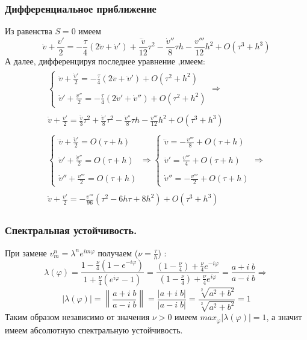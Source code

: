 \documentclass[a4paper,12pt]{article}
\begin{document}
\subsubsection{Дифференциальное приближение}
Из равенства $S=0$ имеем
\[
    \dot v + \frac{v'}{2}=-\frac{\tau}{4}(2\ddot v+ \dot v')+\frac{\dddot v}{12}\tau^2 -\frac{\dot v''}{8} \tau h -\frac{v'''}{12}h^2+O(\tau^3 + h^3)  
\]
А далее, дифференцируя последнее уравнение ,имеем:
\begin{align*}
\begin{array}{l}
\left\{
\begin{array}{l}
\ddot v+ \frac{\dot v'}{2}=-\frac{\tau}{4}(2\dddot v+\ddot v')+O(\tau^2+h^2) \\
\\   
\dot v'+\frac{v''}{2}=-\frac{\tau}{4}(2\ddot v'+\dot v'')+O(\tau^2+h^2)
\end{array} \Rightarrow \\ 
\\  
\dot v + \frac{v'}{2}=\frac{\dddot v}{3}\tau^2+ \frac{\ddot v'}{8} \tau^2-\frac{\dot v''}{8}\tau h - \frac{v'''}{12}h^2+O(\tau^3 + h^3)\\
\\
\left\{
\begin{array}{l}
\dddot v +\frac{\ddot v'}{2}=O(\tau +h)\\ \\
\ddot v' +\frac{\dot v''}{2}=O(\tau +h)\\ \\
\dot v'' +\frac{v'''}{2}=O(\tau +h)
\end{array} \Rightarrow
\left\{
\begin{array}{l}
\dddot v =-\frac{v'''}{8}+O(\tau +h)\\ \\
\ddot v' =\frac{v'''}{4}+O(\tau +h)\\ \\
\dot v'' =-\frac{v'''}{2}+O(\tau +h)
\end{array} \Rightarrow\\ \\
\dot v + \frac{v'}{2}=-\frac{v'''}{96}(\tau^2-6h\tau+8h^2)+O(\tau^3+h^3)
\end{array}
\end{align*}
\subsubsection{Спектральная устойчивость.}
При замене $v^n_m=\lambda^n e^{i m \varphi}$ получаем ($\nu = \frac{\tau}h$) :
\[
    \lambda(\varphi)=\frac{1-\frac{\nu}{4}(1-e^{-i\varphi})}{1+\frac{\nu}{4}(e^{i\varphi}-1)}=\frac{(1-\frac{\nu}{4})+\frac{\nu}{4}e^{-i\varphi}}{(1-\frac{\nu}{4})+\frac{\nu}{4}e^{i\varphi}}=\frac{a + i\; b}{a - i\; b }
    \Rightarrow
\]
\[
    |\lambda(\varphi)|=\left\|\frac{a + i\; b}{a - i\; b}\right\|=\frac{|a + i\; b|}{|a - i\; b|}=\frac{\sqrt[2]{a^2+b^2}}{\sqrt[2]{a^2+b^2}}=1
\]
Таким образом независимо от значения $\nu > 0$ имеем $max_{\varphi}|\lambda(\varphi)|=1$,  а значит имеем абсолютную спектральную устойчивость. 
\end{document}
